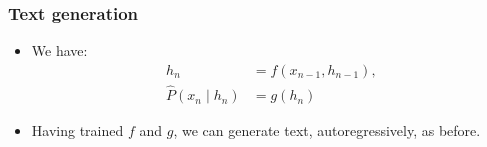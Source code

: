 \documentclass{beamer}
\begin{document}
    \begin{frame}
        \frametitle{Text generation}
    
        \begin{itemize}
            \setlength\itemsep{1em}
        \item We have:
        \begin{align*}
            h_n &= f(x_{n-1}, h_{n-1}),\\[0.5em]
            \widehat{P}(x_n\mid h_n) &= g(h_n)
        \end{align*}

        \item Having trained $f$ and $g$, we can generate text, autoregressively, as before.
    \end{itemize}
    
    \end{frame}
\end{document}
